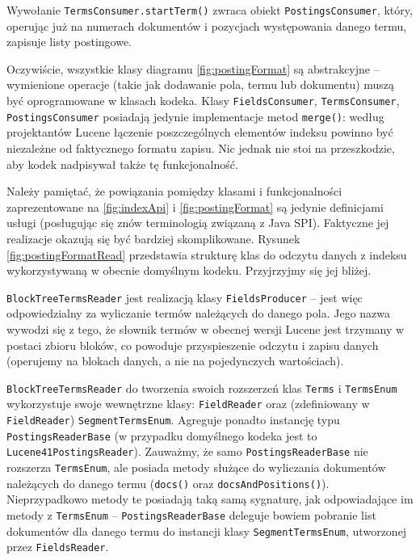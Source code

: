 Wywołanie \texttt{TermsConsumer.startTerm()} zwraca obiekt \texttt{PostingsConsumer}, który, operując już na numerach dokumentów i pozycjach występowania danego termu, zapisuje listy postingowe.

Oczywiście, wszystkie klasy diagramu \ref{fig:postingFormat} są abstrakcyjne -- wymienione operacje (takie jak dodawanie pola, termu lub dokumentu) muszą być oprogramowane w klasach kodeka. Klasy \texttt{FieldsConsumer}, \texttt{TermsConsumer}, \texttt{PostingsConsumer} posiadają jedynie implementacje metod \texttt{merge()}: według projektantów Lucene łączenie poszczególnych elementów indeksu powinno być niezależne od faktycznego formatu zapisu. Nic jednak nie stoi na przeszkodzie, aby kodek nadpisywał także tę funkcjonalność.

Należy pamiętać, że powiązania pomiędzy klasami i funkcjonalności zaprezentowane na \ref{fig:indexApi} i \ref{fig:postingFormat} są jedynie definicjami usługi (posługując się znów terminologią związaną z Java SPI). Faktyczne jej realizacje okazują się być bardziej skomplikowane. Rysunek \ref{fig:postingFormatRead} przedstawia strukturę klas do odczytu danych z indeksu wykorzystywaną w obecnie domyślnym kodeku. Przyjrzyjmy się jej bliżej.

\texttt{BlockTreeTermsReader} jest realizacją klasy \texttt{FieldsProducer} -- jest więc odpowiedzialny za wyliczanie termów należących do danego pola. Jego nazwa wywodzi się z tego, że słownik termów w obecnej wersji Lucene jest trzymany w postaci zbioru bloków, co powoduje przyspieszenie odczytu i zapisu danych (operujemy na blokach danych, a nie na pojedynczych wartościach). 

\texttt{BlockTreeTermsReader} do tworzenia swoich rozszerzeń klas \texttt{Terms} i \texttt{TermsEnum} wykorzystuje swoje wewnętrzne klasy: \texttt{FieldReader} oraz (zdefiniowany w \texttt{FieldReader}) \texttt{SegmentTermsEnum}. Agreguje ponadto instancję typu \texttt{PostingsReaderBase} (w przypadku domyślnego kodeka jest to \texttt{Lucene41PostingsReader}). Zauważmy, że samo \texttt{PostingsReaderBase} nie rozszerza \texttt{TermsEnum}, ale posiada metody służące do wyliczania dokumentów należących do danego termu (\texttt{docs()} oraz \texttt{docsAndPositions()}). Nieprzypadkowo metody te posiadają taką samą sygnaturę, jak odpowiadające im metody z \texttt{TermsEnum} -- \texttt{PostingsReaderBase} deleguje bowiem pobranie list dokumentów dla danego termu do instancji klasy \texttt{SegmentTermsEnum}, utworzonej przez \texttt{FieldsReader}.

